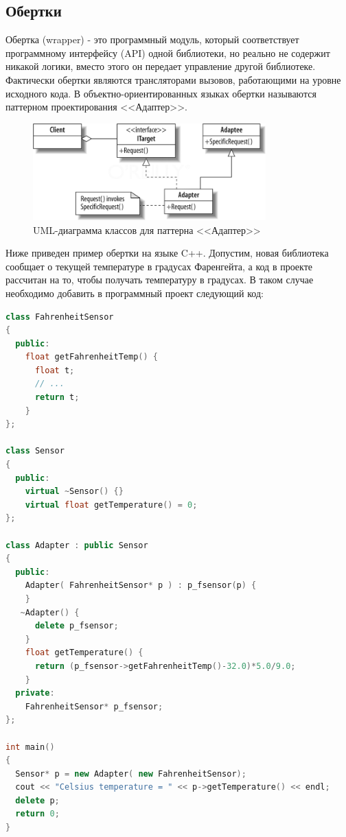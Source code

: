 \subsection{Обертки}

Обертка (wrapper) - это программный модуль, который соответствует программному интерфейсу (API) одной библиотеки, но реально не содержит никакой логики, вместо этого он передает управление другой библиотеке. Фактически обертки являются трансляторами вызовов, работающими на уровне исходного кода. В объектно-ориентированных языках обертки называются паттерном проектирования <<Адаптер>>.

\begin{figure}[H]
	\centering
	\includegraphics[width=0.8\textwidth]{adapter.png}
	\caption{UML-диаграмма классов для паттерна <<Адаптер>>}%
\end{figure}

Ниже приведен пример обертки на языке C++. Допустим, новая библиотека сообщает о текущей температуре в градусах Фаренгейта, а код в проекте рассчитан на то, чтобы получать температуру в градусах. В таком случае необходимо добавить в программный проект следующий код:

\begin{lstlisting}[language=C++]
class FahrenheitSensor
{
  public:
    float getFahrenheitTemp() {
      float t;
      // ...
      return t;
    }
};
  
class Sensor
{    
  public:
    virtual ~Sensor() {}
    virtual float getTemperature() = 0;
};
  
class Adapter : public Sensor
{    
  public:
    Adapter( FahrenheitSensor* p ) : p_fsensor(p) {
    }
   ~Adapter() {
      delete p_fsensor;
    }
    float getTemperature() {
      return (p_fsensor->getFahrenheitTemp()-32.0)*5.0/9.0;
    }
  private:
    FahrenheitSensor* p_fsensor; 
};
  
int main()
{
  Sensor* p = new Adapter( new FahrenheitSensor);
  cout << "Celsius temperature = " << p->getTemperature() << endl;
  delete p;    
  return 0;
}
\end{lstlisting}

